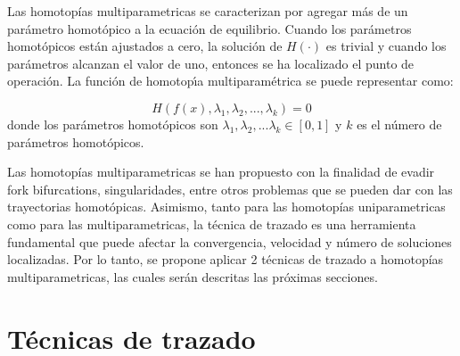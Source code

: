 \documentclass[conference,letterpaper,twocolumn]{IEEEtran}
\begin{document}
Las homotopías multiparametricas \cite{homo_DWolfMulti,BLHOM2,homo_dobletrazado} se caracterizan por agregar más de un parámetro homotópico
a la ecuación de equilibrio. Cuando los parámetros homotópicos están ajustados a cero, la solución
de $H(\cdot)$ es trivial y cuando los parámetros alcanzan el valor de uno, entonces se ha localizado
el punto de operación. La funci\'on de homotop\'{\i}a  multiparam\'etrica se puede representar como:

\begin{equation}
{H}({f}({x}),\lambda_1,\lambda_2,...,\lambda_k)=0
\end{equation} 
donde los parámetros homotópicos son $\lambda_1,\lambda_2,...\lambda_k\in[0,1]$ y $k$ es el n\'umero de par\'ametros homot\'opicos.


Las homotopías multiparametricas \cite{homo_DWolfMulti} se han propuesto con la finalidad
de evadir fork bifurcations, singularidades, entre otros problemas que se pueden dar con las trayectorias
homotópicas. Asimismo, tanto para las homotopías uniparametricas \cite{homo_ArtificialP} como para las multiparametricas, la técnica de trazado \cite{homo_hk,homo_allgower}
es una herramienta fundamental que puede afectar la convergencia, velocidad y número de soluciones localizadas.
Por lo tanto, se propone aplicar 2 técnicas de trazado a homotopías multiparametricas, las cuales
serán descritas las próximas secciones.

\section{Técnicas de trazado}
\end{document}
